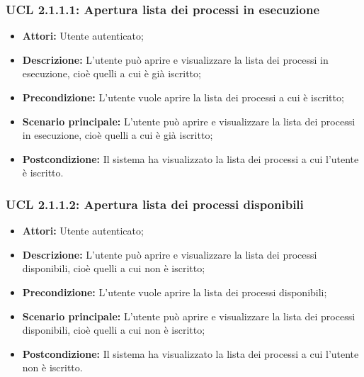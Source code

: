 \hypertarget{L2.1.1.1}{}
\subsubsection{UCL 2.1.1.1: Apertura lista dei processi in esecuzione}
\begin{itemize}
\item \textbf{Attori:} Utente autenticato;
\item \textbf{Descrizione:} L'utente può aprire e visualizzare la lista dei processi in esecuzione, cioè quelli a cui è già iscritto;
\item \textbf{Precondizione:} L'utente vuole aprire la lista dei processi a cui è iscritto;
\item \textbf{Scenario principale:} L'utente può aprire e visualizzare la lista dei processi in esecuzione, cioè quelli a cui è già iscritto;
\item \textbf{Postcondizione:} Il sistema ha visualizzato la lista dei processi a cui l'utente è iscritto.
\end{itemize}

\hypertarget{L2.1.1.2}{}
\subsubsection{UCL 2.1.1.2: Apertura lista dei processi disponibili}
\begin{itemize}
\item \textbf{Attori:} Utente autenticato;
\item \textbf{Descrizione:} L'utente può aprire e visualizzare la lista dei processi disponibili, cioè quelli a cui non è iscritto;
\item \textbf{Precondizione:} L'utente vuole aprire la lista dei processi disponibili;
\item \textbf{Scenario principale:} L'utente può aprire e visualizzare la lista dei processi disponibili, cioè quelli a cui non è iscritto;
\item \textbf{Postcondizione:} Il sistema ha visualizzato la lista dei processi a cui l'utente non è iscritto.
\end{itemize}

